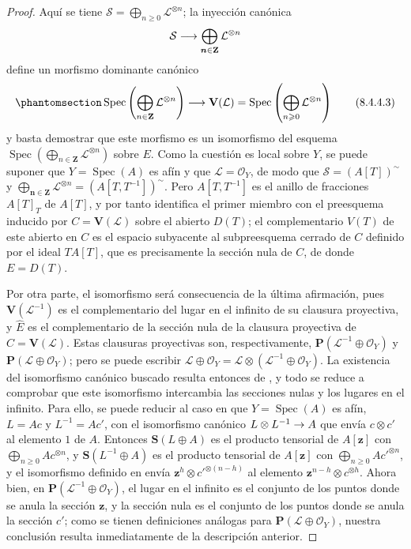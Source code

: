 \documentclass[oneside,10pt]{amsart}
\makeatletter
\renewcommand{\geq}{\geqslant}
\newcommand{\ega@arrow}[2]{\mathchoice{#1}{#2}{#2}{#2}}
\renewcommand{\to}{\ega@arrow{\longrightarrow}{\rightarrow}}
\newcommand{\oldpage}[2][]{\marginnote{\normalfont\footnotesize\textbf{#1}~|~#2}\ignorespaces}
\let\EGAOriginalLabel\label
\renewcommand{\label}[1]{\phantomsection\EGAOriginalLabel{#1}}
\newcommand*{\ega@labelnumber}[1]{\StrBehind{#1}{.}}
\newcommand{\eref}[1]{\hyperref[#1]{\normalfont{(\ega@labelnumber{#1})}}}
\makeatother
\begin{document}
\begin{proof}
Aquí se tiene $\mathcal{S}=\bigoplus_{n\geq0}\mathcal{L}^{\otimes n}$;
la inyección canónica
\[
  \mathcal{S}\to\bigoplus_{\boldsymbol{n}\in\mathbf{Z}}\mathcal{L}^{\otimes n}
\]
define un morfismo dominante canónico
\begin{equation}
\label{II.8.4.4.3-fr}
  \operatorname{Spec}\left(
    \bigoplus_{n\in\mathbf{Z}}\mathcal{L}^{\otimes n}
  \right)
  \to\mathbf{V}(\mathcal{L})
  =\operatorname{Spec}\left(
    \bigoplus_{n\geq0}\mathcal{L}^{\otimes n}
  \right)
\tag{8.4.4.3}
\end{equation}
y basta demostrar que este morfismo es un isomorfismo del esquema $\operatorname{Spec}(\bigoplus_{n\in\mathbf{Z}}\mathcal{L}^{\otimes n})$ sobre $E$.
Como la cuestión es local sobre $Y$, se puede suponer que $Y=\operatorname{Spec}(A)$ es afín
\oldpage[II]{169}
y que $\mathcal{L}=\mathcal{O}_Y$, de modo que $\mathcal{S}=(A[T])^{\sim}$ y $\bigoplus_{\boldsymbol{n}\in\mathbf{Z}}\mathcal{L}^{\otimes n}
=(A[T,T^{-1}])^{\sim}$.
Pero $A[T,T^{-1}]$ es el anillo de fracciones $A[T]_T$ de $A[T]$, y por tanto \eref{II.8.4.4.3-fr} identifica el primer miembro con el preesquema inducido por $C=\mathbf{V}(\mathcal{L})$ sobre el abierto $D(T)$;
el complementario $V(T)$ de este abierto en $C$ es el espacio subyacente al subpreesquema cerrado de $C$ definido por el ideal $TA[T]$, que es precisamente la sección nula de $C$, de donde $E=D(T)$.

Por otra parte, el isomorfismo \eref{II.8.4.4.2-fr} será consecuencia de la última afirmación, pues $\mathbf{V}(\mathcal{L}^{-1})$ es el complementario del lugar en el infinito de su clausura proyectiva, y $\widehat{E}$ es el complementario de la sección nula de la clausura proyectiva de $C=\mathbf{V}(\mathcal{L})$.
Estas clausuras proyectivas son, respectivamente, $\mathbf{P}(\mathcal{L}^{-1}\oplus\mathcal{O}_Y)$ y $\mathbf{P}(\mathcal{L}\oplus\mathcal{O}_Y)$;
pero se puede escribir $\mathcal{L}\oplus\mathcal{O}_Y
=\mathcal{L}\otimes(\mathcal{L}^{-1}\oplus\mathcal{O}_Y)$.
La existencia del isomorfismo canónico buscado resulta entonces de , y todo se reduce a comprobar que este isomorfismo intercambia las secciones nulas y los lugares en el infinito.
Para ello, se puede reducir al caso en que $Y=\operatorname{Spec}(A)$ es afín, $L=Ac$ y $L^{-1}=Ac'$, con el isomorfismo canónico $L\otimes L^{-1}\to A$ que envía $c\otimes c'$ al elemento $1$ de $A$.
Entonces $\mathbf{S}(L\oplus A)$ es el producto tensorial de $A[\mathbf{z}]$ con $\bigoplus_{n\geq0}Ac^{\otimes n}$, y $\mathbf{S}(L^{-1}\oplus A)$ es el producto tensorial de $A[\mathbf{z}]$ con $\bigoplus_{n\geq0}Ac'^{\otimes n}$, y el isomorfismo definido en  envía $\mathbf{z}^h\otimes c'^{\otimes(n-h)}$ al elemento $\mathbf{z}^{n-h}\otimes c^{\otimes h}$.
Ahora bien, en $\mathbf{P}(\mathcal{L}^{-1}\oplus\mathcal{O}_Y)$, el lugar en el infinito es el conjunto de los puntos donde se anula la sección $\mathbf{z}$, y la sección nula es el conjunto de los puntos donde se anula la sección $c'$;
como se tienen definiciones análogas para $\mathbf{P}(\mathcal{L}\oplus\mathcal{O}_Y)$, nuestra conclusión resulta inmediatamente de la descripción anterior.
\end{proof}
\end{document}
